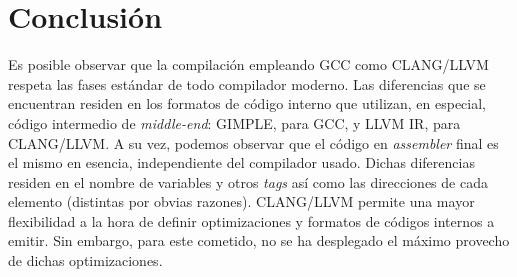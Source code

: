 \chapter{Conclusión}

Es posible observar que la compilación empleando GCC como CLANG/LLVM respeta las
fases estándar de todo compilador moderno. Las diferencias que se encuentran residen en
los formatos de código interno que utilizan, en especial, código intermedio de \emph{middle-end}:
GIMPLE, para GCC, y LLVM IR, para CLANG/LLVM.
A su vez, podemos observar que el código en \emph{assembler} final es el mismo en esencia,
independiente del compilador usado. Dichas diferencias residen en el nombre de variables y
otros \emph{tags} así como las direcciones de cada elemento (distintas por obvias razones).
CLANG/LLVM permite una mayor flexibilidad a la hora de definir optimizaciones y formatos
de códigos internos a emitir. Sin embargo, para este cometido, no se ha desplegado el
máximo provecho de dichas optimizaciones.